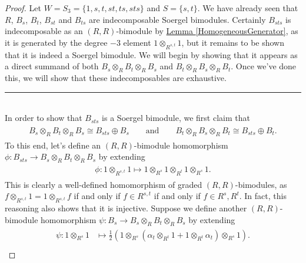 \noindent\begin{proof} Let $W = S_3 = \{1, s, t, st, ts, sts\}$ and $S = \{s, t\}$. We have already seen that $R$, $B_s$, $B_t$, $B_{st}$ and $B_{ts}$ are indecomposable Soergel bimodules. Certainly $B_{sts}$ is indecomposable as an $(R, R)$-bimodule by \hyperref[HomogeneousGenerator]{Lemma \ref*{HomogeneousGenerator}}, as it is generated by the degree $-3$ element $1 \otimes_{R^{s,t}} 1$, but it remains to be shown that it is indeed a Soergel bimodule. We will begin by showing that it appears as a direct summand of both $B_s \otimes_R B_t \otimes_R B_s$ and $B_t \otimes_R B_s \otimes_R B_t$. Once we've done this, we will show that these indecomposables are exhaustive.\\[-1.5\baselineskip]
\begin{center}
\rule{0.5\linewidth}{1pt}
\end{center}
\noindent\\[-\baselineskip] In order to show that $B_{sts}$ is a Soergel bimodule, we first claim that
\begin{align*}
\begin{split}
B_s \otimes_R B_t \otimes_R B_s \cong B_{sts} \oplus B_s\qquad\text{and}\qquad B_t \otimes_R B_s \otimes_R B_t \cong B_{sts} \oplus B_t.
\end{split}
\end{align*}
\noindent To this end, let's define an $(R, R)$-bimodule homomorphism $\phi : B_{sts} \to B_s \otimes_R B_t \otimes_R B_s$ by extending
\begin{align*}
\begin{split}
\phi : 1 \otimes_{R^{s,t}} 1 \mapsto 1 \otimes_{R^s} 1 \otimes_{R^t} 1 \otimes_{R^s} 1.
\end{split}
\end{align*}
\noindent This is clearly a well-defined homomorphism of graded $(R, R)$-bimodules, as $f \otimes_{R^{s,t}} 1 = 1 \otimes_{R^{s,t}} f$ if and only if $f \in R^{s,t}$ if and only if $f \in R^s, R^t$. In fact, this reasoning also shows that it is injective. Suppose we define another $(R, R)$-bimodule homomorphism $\psi : B_s \to B_s \otimes_R B_t \otimes_R B_s$ by extending
\begin{align*}
\begin{split}
\psi : 1 \otimes_{R^s} 1 &\mapsto \frac{1}{2}(1 \otimes_{R^s} (\alpha_t \otimes_{R^t} 1 + 1 \otimes_{R^t} \alpha_t) \otimes_{R^s} 1).\\

\end{split}
\end{align*}
\end{proof}
